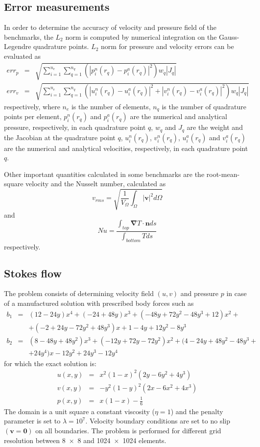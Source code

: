 \documentclass[hidelinks,11pt,a4paper]{article}
\begin{document}
\subsection{Error measurements}\label{sec:error}
In order to determine the accuracy of velocity and pressure field of the benchmarks, the $L_2$ norm is computed by numerical integration on the Gauss-Legendre quadrature points. $L_2$ norm for pressure and velocity errors can be evaluated as
\begin{eqnarray}
err_p&=&\sqrt{\sum_{i=1}^{n_e}\sum_{q=1}^{n_q}\left(|p^n_i(r_q)-p^a_i(r_q)|^2\right)w_q|J_q|}\nonumber \\
err_v&=&\sqrt{\sum_{i=1}^{n_e}\sum_{q=1}^{n_q}\left(|u^n_i(r_q)-u^a_i(r_q)|^2+|v^n_i(r_q)-v^a_i(r_q)|^2\right)w_q|J_q|}\nonumber
\end{eqnarray}
respectively, where $n_e$ is the number of elements, $n_q$ is the number of quadrature points per element, $p^n_i(r_q)$ and $p^a_i(r_q)$ are the numerical and analytical pressure, respectively, in each quadrature point $q$, $w_q$  and $J_q$ are the weight and the Jacobian at the quadrature point $q$, $u^n_i(r_q)$, $v^n_i(r_q)$, $u^a_i(r_q)$ and $v^a_i(r_q)$ are the numerical and analytical velocities, respectively, in each quadrature point $q$.

Other important quantities calculated in some benchmarks are the root-mean-square velocity and the Nusselt number, calculated as
\[v_{rms}=\sqrt{\frac{1}{V_{\Omega}}\int_{\Omega}|\bm{v}|^2 d\Omega}\]
and
\[Nu=\frac{\int_{top}\bm{\nabla} T \cdot \bm{n} ds}{\int_{bottom}T ds}\]
respectively.

\subsection{Stokes flow}\label{sec:stokes}
The problem consists of determining velocity field $(u,v)$ and pressure $p$ in case of a manufactured solution with prescribed body forces such as
\begin{eqnarray}
b_1&=&(12-24y)x^4+(-24+48y)x^3+(-48y+72y^2-48y^3+12)x^2+\nonumber \\
&&+(-2+24y-72y^2+48y^3)x+1-4y+12y^2-8y^3\nonumber \\
b_2&=&(8-48y+48y^2)x^3+(-12y+72y-72y^2)x^2+(4-24y+48y^2-48y^3+\nonumber \\
&&+24y^4)x-12y^2+24y^3-12y^4\nonumber
\end{eqnarray}
for which the exact solution is:
\begin{eqnarray}
u(x,y)&=&x^2(1-x)^2(2y-6y^2+4y^3)\nonumber \\
v(x,y)&=&-y^2(1-y)^2(2x-6x^2+4x^3)\nonumber \\
p(x,y)&=&x(1-x)-\frac{1}{6}\nonumber
\end{eqnarray}
The domain is a unit square a constant viscosity ($\eta=1$) and the penalty parameter is set to $\lambda=10^7$. Velocity boundary conditions are set to no slip $(\bm{v}=\bm{0})$ on all boundaries. The problem is performed for different grid resolution between \num{8x8} and \num{1024x1024} elements.
\end{document}
